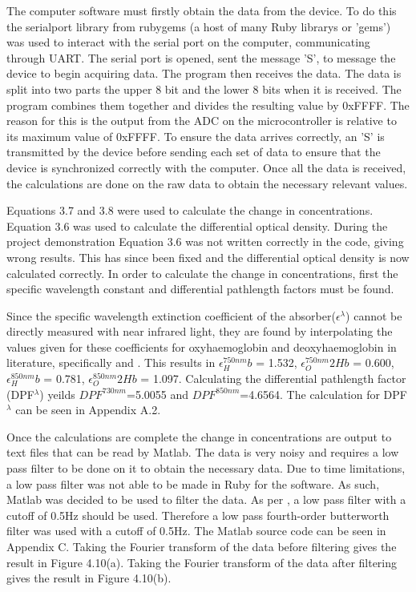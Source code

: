 The computer software must firstly obtain the data from the device. To do this the serialport library from rubygems (a host of many Ruby librarys or 'gems') was used to interact with the serial port on the computer, communicating through UART. The serial port is opened, sent the message 'S', to message the device to begin acquiring data. The program then receives the data. The data is split into two parts the upper 8 bit and the lower 8 bits when it is received. The program combines them together and divides the resulting value by 0xFFFF. The reason for this is the output from the ADC on the microcontroller is relative to its maximum value of 0xFFFF. To ensure the data arrives correctly, an 'S' is transmitted by the device before sending each set of data to ensure that the device is synchronized correctly with the computer. Once all the data is received, the calculations are done on the raw data to obtain the necessary relevant values.

Equations 3.7 and 3.8 were used to calculate the change in concentrations. Equation 3.6 was used to calculate the differential optical density. During the project demonstration Equation 3.6 was not written correctly in the code, giving wrong results. This has since been fixed and the differential optical density is now calculated correctly. In order to calculate the change in concentrations, first the specific wavelength constant and differential pathlength factors must be found.

Since the specific wavelength extinction coefficient of the absorber($\epsilon^\lambda$) cannot be directly measured with near infrared light, they are found by interpolating the values given for these coefficients for oxyhaemoglobin and deoxyhaemoglobin in literature, specifically \cite{wray88} and \cite{roe91}. This results in $\epsilon^{750nm}_Hb$ = 1.532, $\epsilon^{750nm}_O2Hb$ = 0.600, $\epsilon^{850nm}_Hb$ = 0.781, $\epsilon^{850nm}_O2Hb$ = 1.097. Calculating the differential pathlength factor (DPF$^\lambda$) yeilds $DPF^{730nm}$=5.0055 and $DPF^{850nm}$=4.6564. The calculation for DPF$^\lambda$ can be seen in Appendix A.2.

Once the calculations are complete the change in concentrations are output to text files that can be read by Matlab. The data is very noisy and requires a low pass filter to be done on it to obtain the necessary data. Due to time limitations, a low pass filter was not able to be made in Ruby for the software. As such, Matlab was decided to be used to filter the data. As per \cite{wolf05}, a low pass filter with a cutoff of 0.5Hz should be used. Therefore a low pass fourth-order butterworth filter was used with a cutoff of 0.5Hz. The Matlab source code can be seen in Appendix C. Taking the Fourier transform of the data before filtering gives the result in Figure 4.10(a). Taking the Fourier transform of the data after filtering gives the result in Figure 4.10(b).

